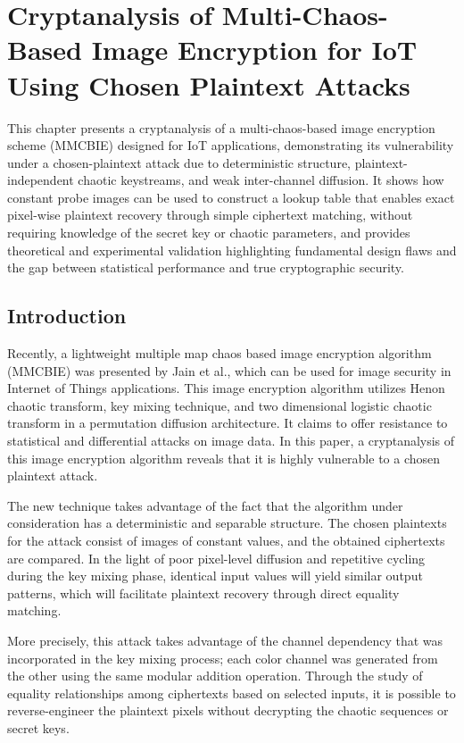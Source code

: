 \chapter{Cryptanalysis of Multi-Chaos-Based Image Encryption for IoT Using Chosen Plaintext Attacks}

This chapter presents a cryptanalysis of a multi-chaos-based image encryption scheme (MMCBIE) designed for IoT applications, demonstrating its vulnerability under a chosen-plaintext attack due to deterministic structure, plaintext-independent chaotic keystreams, and weak inter-channel diffusion. It shows how constant probe images can be used to construct a lookup table that enables exact pixel-wise plaintext recovery through simple ciphertext matching, without requiring knowledge of the secret key or chaotic parameters, and provides theoretical and experimental validation highlighting fundamental design flaws and the gap between statistical performance and true cryptographic security.

\section{Introduction}

Recently, a lightweight multiple map chaos based image encryption algorithm (MMCBIE) was presented by Jain et al.\cite{jain2024mmcbie}, which can be used for image security in Internet of Things applications. This image encryption algorithm utilizes Henon chaotic transform, key mixing technique, and two dimensional logistic chaotic transform in a permutation diffusion architecture. It claims to offer resistance to statistical and differential attacks on image data. In this paper, a cryptanalysis of this image encryption algorithm reveals that it is highly vulnerable to a chosen plaintext attack.

The new technique takes advantage of the fact that the algorithm under consideration has a deterministic and separable structure. The chosen plaintexts for the attack consist of images of constant values, and the obtained ciphertexts are compared. In the light of poor pixel-level diffusion and repetitive cycling during the key mixing phase, identical input values will yield similar output patterns, which will facilitate plaintext recovery through direct equality matching.

More precisely, this attack takes advantage of the channel dependency that was incorporated in the key mixing process; each color channel was generated from the other using the same modular addition operation. Through the study of equality relationships among ciphertexts based on selected inputs, it is possible to reverse-engineer the plaintext pixels without decrypting the chaotic sequences or secret keys.

